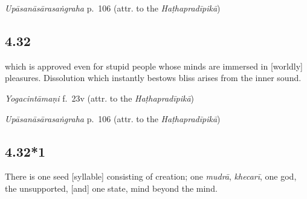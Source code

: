 \begin{ekdosis}
\begin{testimonia}[hp04_031]
\emph{Upāsanāsārasaṅgraha} p.~106 (attr. to the \emph{Haṭhapradīpikā})
\begin{versinnote}
\end{versinnote}
\end{testimonia}



\subsection*{4.32}
\begin{translation}[hp04_032]
which is approved even for stupid people whose minds are immersed in [worldly] pleasures. Dissolution which instantly bestows bliss arises from the inner sound.
\end{translation}



\begin{testimonia}[hp04_032]
\emph{Yogacintāmaṇi} f.~23v (attr. to the \emph{Haṭhapradīpikā})
\begin{versinnote}
\end{versinnote}

\emph{Upāsanāsārasaṅgraha} p.~106 (attr. to the \emph{Haṭhapradīpikā})
\begin{versinnote}
\end{versinnote}
\end{testimonia}


\subsection*{4.32*1}
\begin{translation}[hp04_032_1]
There is one seed [syllable] consisting of creation; one \emph{mudrā}, \emph{khecarī}, one god, the unsupported, [and] one state, mind beyond the mind.
\end{translation}


\end{ekdosis}
